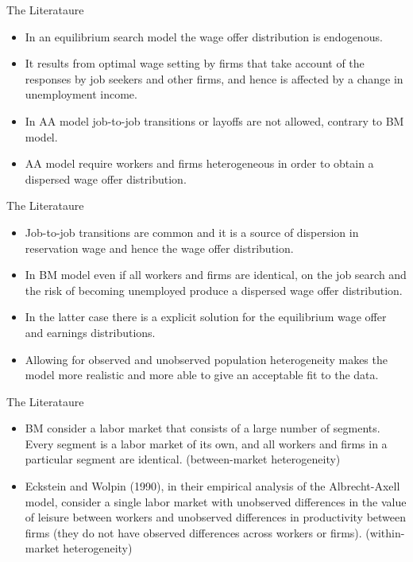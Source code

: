 \documentclass{beamer}
\begin{document}
\begin{frame}{The Literataure}
    \begin{itemize}
        \item In an equilibrium search model the wage offer distribution is endogenous.
        \item It results from optimal wage setting by firms that take account of the responses by job seekers and other firms, and hence is affected by a change in unemployment income.
        \item In AA model job-to-job transitions or layoffs are not allowed, contrary to BM model.
        \item AA model require workers and firms heterogeneous in order to obtain a dispersed wage offer distribution.
    \end{itemize}
\end{frame}


\begin{frame}{The Literataure}
    \begin{itemize}
        \item Job-to-job transitions are common and it is a source of dispersion in reservation wage and hence the wage offer distribution.
        \item In BM model even if all workers and firms are identical, on the job search and the risk of becoming unemployed produce a dispersed wage offer distribution.
        \item In the latter case there is a explicit solution for the equilibrium wage offer and earnings distributions.
        \item Allowing for observed and unobserved population heterogeneity makes the model more realistic and more able to give an acceptable fit to the data.
    \end{itemize}
\end{frame}


\begin{frame}{The Literataure}
    \begin{itemize}
        \item BM consider a labor market that consists of a large number of segments. Every segment is a labor market of its own, and all workers and firms in a particular segment are identical. (between-market heterogeneity)
        \item Eckstein and Wolpin (1990), in their empirical analysis of the Albrecht-Axell model, consider a single labor market with unobserved differences in the value of leisure between workers and unobserved differences in productivity between firms (they do not have observed differences across workers or firms). (within-market heterogeneity)
    \end{itemize}
\end{frame}
\end{document}
